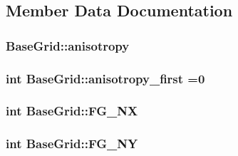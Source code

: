 \subsection{Member Data Documentation}
\hypertarget{class_base_grid_a94e75cceb5af2a28d65840e32bf3ebf0}{
\subsubsection[{anisotropy}]{ Base\-Grid\-::anisotropy\hspace{0.3cm}{\ttfamily [static]}}}\label{class_base_grid_a94e75cceb5af2a28d65840e32bf3ebf0}
\hypertarget{class_base_grid_ae6b32024676eb5c27fcb4abad5982f8d}{
\subsubsection[{anisotropy\-\_\-first}]{\setlength{\rightskip}{0pt plus 5cm}int Base\-Grid\-::anisotropy\-\_\-first =0\hspace{0.3cm}{\ttfamily [static]}}}\label{class_base_grid_ae6b32024676eb5c27fcb4abad5982f8d}
\hypertarget{class_base_grid_ae2f8fc9fc2edbad1fbabf64d015bb47e}{
\subsubsection[{F\-G\-\_\-\-N\-X}]{\setlength{\rightskip}{0pt plus 5cm}int Base\-Grid\-::\-F\-G\-\_\-\-N\-X\hspace{0.3cm}{\ttfamily [static]}}}\label{class_base_grid_ae2f8fc9fc2edbad1fbabf64d015bb47e}
\hypertarget{class_base_grid_a514a9d96f0e6705ddc362c3283104c00}{
\subsubsection[{F\-G\-\_\-\-N\-Y}]{\setlength{\rightskip}{0pt plus 5cm}int Base\-Grid\-::\-F\-G\-\_\-\-N\-Y\hspace{0.3cm}{\ttfamily [static]}}}\label{class_base_grid_a514a9d96f0e6705ddc362c3283104c00}
